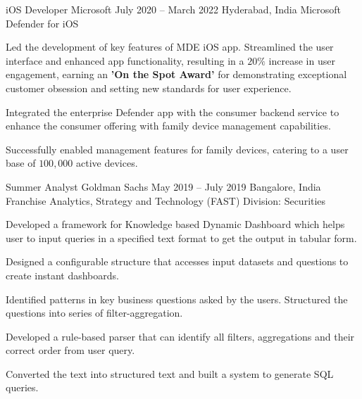 \documentclass[letterpaper]{resume_config}
\begin{document}
\vspace{5pt}
\WorkExperience
    {iOS Developer} %
    {Microsoft} %
    {July 2020 -- March 2022} %
    {Hyderabad, India} %
    {Microsoft Defender for iOS}
    {
        \item Led the development of key features of MDE iOS app. Streamlined the user interface and enhanced app functionality, resulting in a $20\%$ increase in user engagement, earning an \textbf{'On the Spot Award'} for demonstrating exceptional customer obsession and setting new standards for user experience.
        \item Integrated the enterprise Defender app with the consumer backend service to enhance the consumer offering with family device management capabilities.
    }
    {
        \item Successfully enabled management features for family devices, catering to a user base of $100,000$ active devices.
    }

\vspace{5pt}
\WorkExperience
    {Summer Analyst} %
    {Goldman Sachs} %
    {May 2019 -- July 2019} %
    {Bangalore, India} %
    {Franchise Analytics, Strategy and Technology (FAST) Division: Securities}
    {
        \item Developed a framework for Knowledge based Dynamic Dashboard which helps user to input queries in a specified text format to get the output in tabular form.
    }
    {
        \item Designed a configurable structure that accesses input datasets and questions to create instant dashboards.
        \item Identified patterns in key business questions asked by the users. Structured the questions into series of filter-aggregation.
        \item Developed a rule-based parser that can identify all filters, aggregations and their correct order from user query.
        \item Converted the text into structured text and built a system to generate SQL queries.
        }
\end{document}
